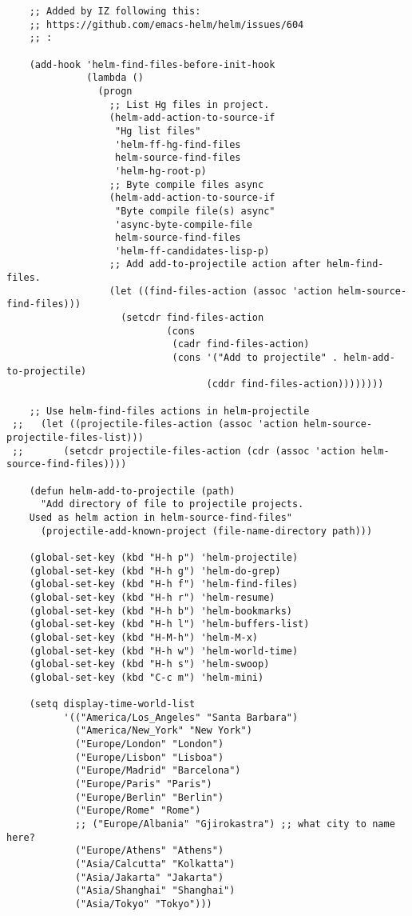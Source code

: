 \documentclass{article}
\begin{document}
\begin{enumerate}
\begin{verbatim}
    ;; Added by IZ following this:
    ;; https://github.com/emacs-helm/helm/issues/604
    ;; :

    (add-hook 'helm-find-files-before-init-hook
              (lambda ()
                (progn
                  ;; List Hg files in project.
                  (helm-add-action-to-source-if
                   "Hg list files"
                   'helm-ff-hg-find-files
                   helm-source-find-files
                   'helm-hg-root-p)
                  ;; Byte compile files async
                  (helm-add-action-to-source-if
                   "Byte compile file(s) async"
                   'async-byte-compile-file
                   helm-source-find-files
                   'helm-ff-candidates-lisp-p)
                  ;; Add add-to-projectile action after helm-find-files.
                  (let ((find-files-action (assoc 'action helm-source-find-files)))
                    (setcdr find-files-action
                            (cons
                             (cadr find-files-action)
                             (cons '("Add to projectile" . helm-add-to-projectile)
                                   (cddr find-files-action))))))))

    ;; Use helm-find-files actions in helm-projectile
 ;;   (let ((projectile-files-action (assoc 'action helm-source-projectile-files-list)))
 ;;       (setcdr projectile-files-action (cdr (assoc 'action helm-source-find-files))))

    (defun helm-add-to-projectile (path)
      "Add directory of file to projectile projects.
    Used as helm action in helm-source-find-files"
      (projectile-add-known-project (file-name-directory path)))

    (global-set-key (kbd "H-h p") 'helm-projectile)
    (global-set-key (kbd "H-h g") 'helm-do-grep)
    (global-set-key (kbd "H-h f") 'helm-find-files)
    (global-set-key (kbd "H-h r") 'helm-resume)
    (global-set-key (kbd "H-h b") 'helm-bookmarks)
    (global-set-key (kbd "H-h l") 'helm-buffers-list)
    (global-set-key (kbd "H-M-h") 'helm-M-x)
    (global-set-key (kbd "H-h w") 'helm-world-time)
    (global-set-key (kbd "H-h s") 'helm-swoop)
    (global-set-key (kbd "C-c m") 'helm-mini)

    (setq display-time-world-list
          '(("America/Los_Angeles" "Santa Barbara")
            ("America/New_York" "New York")
            ("Europe/London" "London")
            ("Europe/Lisbon" "Lisboa")
            ("Europe/Madrid" "Barcelona")
            ("Europe/Paris" "Paris")
            ("Europe/Berlin" "Berlin")
            ("Europe/Rome" "Rome")
            ;; ("Europe/Albania" "Gjirokastra") ;; what city to name here?
            ("Europe/Athens" "Athens")
            ("Asia/Calcutta" "Kolkatta")
            ("Asia/Jakarta" "Jakarta")
            ("Asia/Shanghai" "Shanghai")
            ("Asia/Tokyo" "Tokyo")))
\end{verbatim}
\end{enumerate}
\end{document}
